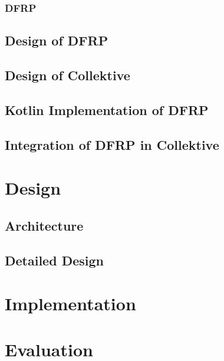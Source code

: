 \documentclass[12pt,a4paper,openright,twoside]{book}
\begin{document}
\subsection{DFRP}

\section{Design of DFRP}


\section{Design of Collektive}


\section{Kotlin Implementation of DFRP}

\section{Integration of DFRP in Collektive}

\chapter{Design}
\label{chap:design}

\section{Architecture}

\section{Detailed Design}

\chapter{Implementation}
\label{chap:implementation}
\chapter{Evaluation}
\label{chap:evaluation}
\end{document}
